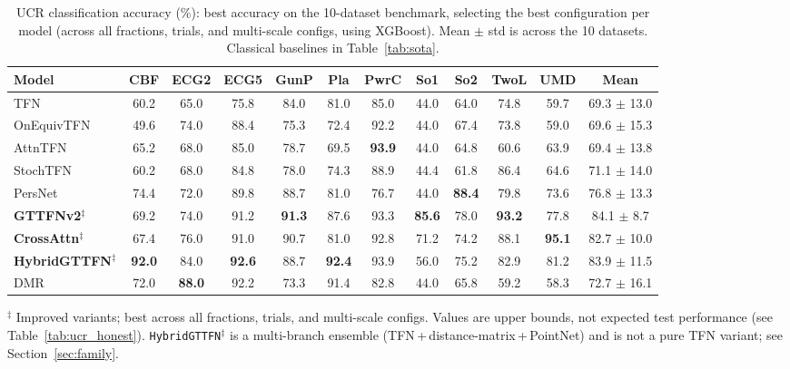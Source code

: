 \documentclass[a4paper,11pt]{article}
\begin{document}
\begin{table}[ht]
\centering
\caption{UCR classification accuracy (\%): best accuracy on the 10-dataset benchmark, selecting the best configuration per model (across all fractions, trials, and multi-scale configs, using XGBoost). Mean $\pm$ std is across the 10 datasets. Classical baselines in Table~\ref{tab:sota}.}
\label{tab:ucr_main}
\footnotesize
\begin{tabular}{lcccccccccc|c}
\toprule
Model & CBF & ECG2 & ECG5 & GunP & Pla & PwrC & So1 & So2 & TwoL & UMD & Mean \\
\midrule
TFN & 60.2 & 65.0 & 75.8 & 84.0 & 81.0 & 85.0 & 44.0 & 64.0 & 74.8 & 59.7 & 69.3 $\pm$ 13.0 \\
OnEquivTFN & 49.6 & 74.0 & 88.4 & 75.3 & 72.4 & 92.2 & 44.0 & 67.4 & 73.8 & 59.0 & 69.6 $\pm$ 15.3 \\
AttnTFN & 65.2 & 68.0 & 85.0 & 78.7 & 69.5 & \textbf{93.9} & 44.0 & 64.8 & 60.6 & 63.9 & 69.4 $\pm$ 13.8 \\
StochTFN & 60.2 & 68.0 & 84.8 & 78.0 & 74.3 & 88.9 & 44.4 & 61.8 & 86.4 & 64.6 & 71.1 $\pm$ 14.0 \\
PersNet & 74.4 & 72.0 & 89.8 & 88.7 & 81.0 & 76.7 & 44.0 & \textbf{88.4} & 79.8 & 73.6 & 76.8 $\pm$ 13.3 \\
\textbf{GTTFNv2}$^{\ddagger}$ & 69.2 & 74.0 & 91.2 & \textbf{91.3} & 87.6 & 93.3 & \textbf{85.6} & 78.0 & \textbf{93.2} & 77.8 & 84.1 $\pm$ 8.7 \\
\textbf{CrossAttn}$^{\ddagger}$ & 67.4 & 76.0 & 91.0 & 90.7 & 81.0 & 92.8 & 71.2 & 74.2 & 88.1 & \textbf{95.1} & 82.7 $\pm$ 10.0 \\
\textbf{HybridGTTFN}$^{\ddagger}$ & \textbf{92.0} & 84.0 & \textbf{92.6} & 88.7 & \textbf{92.4} & 93.9 & 56.0 & 75.2 & 82.9 & 81.2 & 83.9 $\pm$ 11.5 \\
DMR & 72.0 & \textbf{88.0} & 92.2 & 73.3 & 91.4 & 82.8 & 44.0 & 65.8 & 59.2 & 58.3 & 72.7 $\pm$ 16.1 \\
\bottomrule
\end{tabular}
\footnotesize
$^{\ddagger}$ Improved variants; best across all fractions, trials, and multi-scale configs. Values are upper bounds, not expected test performance (see Table~\ref{tab:ucr_honest}). \texttt{HybridGTTFN}$^{\ddagger}$ is a multi-branch ensemble (TFN\,+\,distance-matrix\,+\,PointNet) and is not a pure TFN variant; see Section~\ref{sec:family}.
\end{table}
\end{document}
